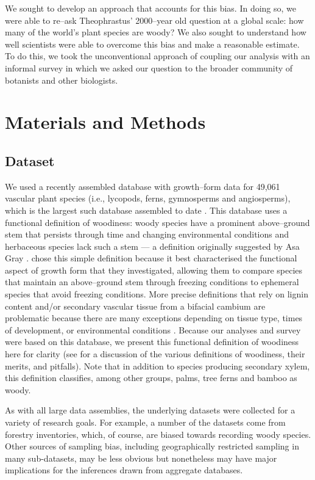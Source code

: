 \documentclass[a4paper,12pt]{article}
\begin{document}
We sought to develop an approach that accounts for this bias.  In
doing so, we were able to re--ask Theophrastus' 2000--year old
question at a global scale: how many of the world's plant species are
woody?
%
We also sought to understand how well scientists were able to overcome
this bias and make a reasonable estimate.  To do this, we took the
unconventional approach of coupling our analysis with an informal
survey in which we asked our question to the broader community of
botanists and other biologists.

\section{Materials and Methods}

\subsection{Dataset}

We used a recently assembled database with growth--form data for
49,061 vascular plant species (i.e., lycopods, ferns, gymnosperms and
angiosperms), which is the largest such database assembled to date
\citep[][available on the Dryad data repository; doi:10.5061/dryad.63q27/2]{ZanneDryad,Zanne}.
%
This database uses a functional definition of woodiness: woody species
have a prominent above--ground stem that persists through time and changing
environmental conditions and herbaceous species lack such a stem --- 
a definition originally suggested by Asa Gray \citeyearpar{gray1887elements}. 
\citet{Zanne}
chose this simple definition because it best characterised the functional
aspect of growth form that they investigated, allowing them to compare 
species that maintain an above--ground stem through freezing conditions to 
ephemeral species that avoid freezing conditions.  More precise definitions 
that rely on lignin content and/or secondary vascular tissue from a bifacial
cambium are problematic because there are many exceptions depending on tissue 
type, times of development, or environmental conditions 
\citep{Groover2005, Spicer2010, Rowe2012}.  
Because our analyses and survey were based on this database, 
we present this functional definition of woodiness here for clarity 
(see \citet{Zanne} for a discussion of the various definitions of woodiness, 
their merits, and pitfalls).  Note that in addition to species producing
secondary xylem, this definition
classifies, among other groups, palms, tree ferns and bamboo as
woody.

As with all large data assemblies, the underlying datasets were collected 
for a variety of research goals. For example, a number of the datasets come
from forestry inventories, which, of course, are biased towards recording
woody species. Other sources of sampling bias, including geographically restricted sampling 
in many sub-datasets, may be less obvious but
nonetheless may have major implications for the inferences drawn from 
aggregate databases.
\end{document}
